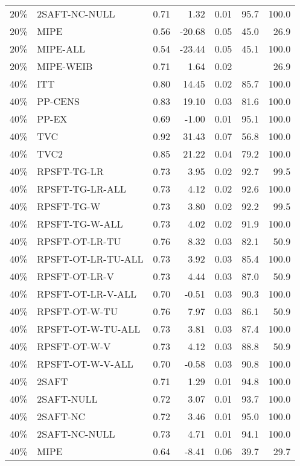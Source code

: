 \begin{table}[ht]
{\begin{tabular}{llrrrrr}
  20\% & 2SAFT-NC-NULL & 0.71 & 1.32 & 0.01 & 95.7 & 100.0 \\ 
  20\% & MIPE & 0.56 & -20.68 & 0.05 & 45.0 & 26.9 \\ 
  20\% & MIPE-ALL & 0.54 & -23.44 & 0.05 & 45.1 & 100.0 \\ 
  20\% & MIPE-WEIB & 0.71 & 1.64 & 0.02 &  & 26.9 \\ 
   \hline
40\% & ITT & 0.80 & 14.45 & 0.02 & 85.7 & 100.0 \\ 
  40\% & PP-CENS & 0.83 & 19.10 & 0.03 & 81.6 & 100.0 \\ 
  40\% & PP-EX & 0.69 & -1.00 & 0.01 & 95.1 & 100.0 \\ 
  40\% & TVC & 0.92 & 31.43 & 0.07 & 56.8 & 100.0 \\ 
  40\% & TVC2 & 0.85 & 21.22 & 0.04 & 79.2 & 100.0 \\ 
   \hline
40\% & RPSFT-TG-LR & 0.73 & 3.95 & 0.02 & 92.7 & 99.5 \\ 
  40\% & RPSFT-TG-LR-ALL & 0.73 & 4.12 & 0.02 & 92.6 & 100.0 \\ 
  40\% & RPSFT-TG-W & 0.73 & 3.80 & 0.02 & 92.2 & 99.5 \\ 
  40\% & RPSFT-TG-W-ALL & 0.73 & 4.02 & 0.02 & 91.9 & 100.0 \\ 
  40\% & RPSFT-OT-LR-TU & 0.76 & 8.32 & 0.03 & 82.1 & 50.9 \\ 
  40\% & RPSFT-OT-LR-TU-ALL & 0.73 & 3.92 & 0.03 & 85.4 & 100.0 \\ 
  40\% & RPSFT-OT-LR-V & 0.73 & 4.44 & 0.03 & 87.0 & 50.9 \\ 
  40\% & RPSFT-OT-LR-V-ALL & 0.70 & -0.51 & 0.03 & 90.3 & 100.0 \\ 
   \hline
40\% & RPSFT-OT-W-TU & 0.76 & 7.97 & 0.03 & 86.1 & 50.9 \\ 
  40\% & RPSFT-OT-W-TU-ALL & 0.73 & 3.81 & 0.03 & 87.4 & 100.0 \\ 
  40\% & RPSFT-OT-W-V & 0.73 & 4.12 & 0.03 & 88.8 & 50.9 \\ 
  40\% & RPSFT-OT-W-V-ALL & 0.70 & -0.58 & 0.03 & 90.8 & 100.0 \\ 
   \hline
40\% & 2SAFT & 0.71 & 1.29 & 0.01 & 94.8 & 100.0 \\ 
  40\% & 2SAFT-NULL & 0.72 & 3.07 & 0.01 & 93.7 & 100.0 \\ 
  40\% & 2SAFT-NC & 0.72 & 3.46 & 0.01 & 95.0 & 100.0 \\ 
  40\% & 2SAFT-NC-NULL & 0.73 & 4.71 & 0.01 & 94.1 & 100.0 \\ 
  40\% & MIPE & 0.64 & -8.41 & 0.06 & 39.7 & 29.7 \\ 

\end{tabular}}
\end{table}
